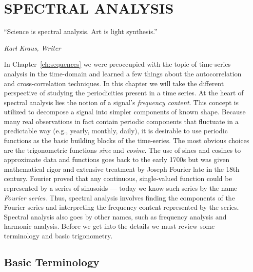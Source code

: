 %
\chapter{SPECTRAL ANALYSIS}
\label{cg:spectralanallysis}
\epigraph{``Science is spectral analysis. Art is light synthesis.''}{\textit{Karl Kraus, Writer}}

	In Chapter~\ref{ch:sequences} we were preoccupied with the topic of time-series analysis in the time-domain 
and learned a few things about the autocorrelation and cross-correlation techniques.  
In this chapter we will take the different perspective of studying the periodicities present in a time 
series.
	At the heart of spectral analysis lies the notion of a signal's \emph{frequency content}.  This concept is 
utilized to decompose a signal into simpler components of known shape.  Because many real 
observations in fact contain periodic components that fluctuate in a predictable way (e.g., yearly, monthly, 
daily), it is desirable to use periodic functions as the basic building blocks of the time-series.  
The most obvious choices are the trigonometric functions \emph{sine} and \emph{cosine}.
	The use of sines and cosines to approximate data and functions goes back to the early 1700s 
but was given mathematical rigor and extensive treatment by Joseph Fourier late in the 18th century.  
Fourier proved that any continuous, single-valued function could be represented by a series of 
sinusoids --- today we know such series by the name \emph{Fourier series}.  Thus, spectral analysis 
involves finding the components of the Fourier series and interpreting the frequency content 
represented by the series.  Spectral analysis also goes by other names, such as frequency analysis and 
harmonic analysis.  Before we get into the details we must review some terminology and basic 
trigonometry.

\section{Basic Terminology}

